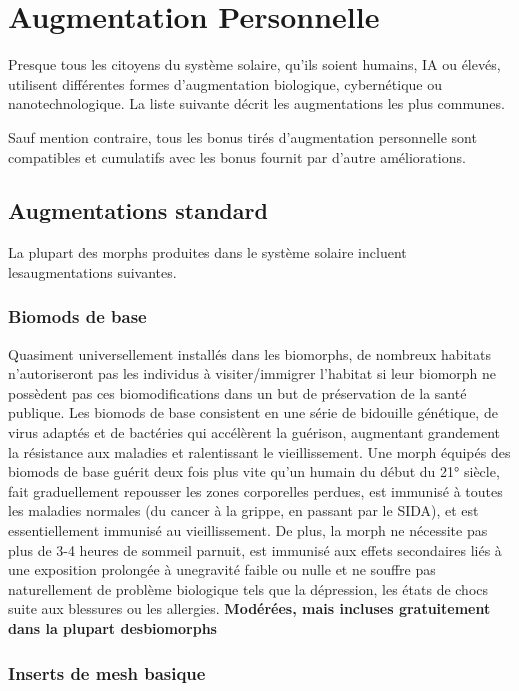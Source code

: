 \section{Augmentation Personnelle} \label{sec:personal-augmentation} 

Presque tous les citoyens du système solaire, qu'ils soient humains, IA ou élevés, utilisent différentes formes d'augmentation biologique, cybernétique ou nanotechnologique. La liste suivante décrit les augmentations les plus communes.  

Sauf mention contraire, tous les bonus tirés d'augmentation personnelle sont compatibles et cumulatifs avec les bonus fournit par d'autre améliorations. 

\subsection{Augmentations standard} \label{sec:std-augmentations} 

La plupart des morphs produites dans le système solaire incluent lesaugmentations suivantes. 

\subsubsection{Biomods de base} 

Quasiment universellement  installés dans les biomorphs, de nombreux habitats n'autoriseront pas les individus à visiter/immigrer l'habitat si leur biomorph ne possèdent pas ces biomodifications dans un but de préservation de la santé publique. Les biomods de base consistent en une série de bidouille génétique, de virus adaptés et de bactéries qui accélèrent la guérison, augmentant grandement la résistance aux maladies et ralentissant le vieillissement. Une morph équipés des biomods de base guérit deux fois plus vite qu'un humain du début du 21° siècle, fait graduellement repousser les zones corporelles perdues, est immunisé à toutes les maladies normales (du cancer à la grippe, en passant par le SIDA), et est essentiellement immunisé au vieillissement. De plus, la morph ne nécessite pas plus de 3-4 heures de sommeil parnuit, est immunisé aux effets secondaires liés à une exposition prolongée à unegravité faible ou nulle et ne souffre pas naturellement de problème biologique tels que la dépression, les états de chocs suite aux blessures ou les allergies. \textbf{{Modérées, mais incluses gratuitement dans la plupart desbiomorphs}} 

\subsubsection{Inserts de mesh basique} 


